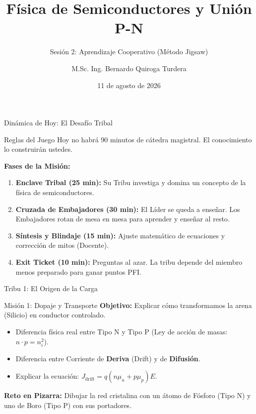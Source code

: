 \documentclass[10pt, aspectratio=169]{beamer}
\title[Circuitos III - Dinámica Tribal]{Física de Semiconductores y Unión P-N}
\subtitle{Sesión 2: Aprendizaje Cooperativo (Método Jigsaw)}
\author{M.Sc. Ing. Bernardo Quiroga Turdera}
\institute[UCB Tarija]{Universidad Católica Boliviana ``San Pablo'' -- Sede Tarija}
\date{11 de agosto de 2026}
\begin{document}
\begin{frame}
  \titlepage
\end{frame}

\begin{frame}{Dinámica de Hoy: El Desafío Tribal}
  \begin{block}{Reglas del Juego}
    Hoy no habrá 90 minutos de cátedra magistral. El conocimiento lo construirán ustedes.
  \end{block}
  
  \vspace{0.3cm}
  \textbf{Fases de la Misión:}
  \begin{enumerate}
      \item \textbf{Enclave Tribal (25 min):} Su Tribu investiga y domina un concepto de la física de semiconductores.
      \item \textbf{Cruzada de Embajadores (30 min):} El Líder se queda a enseñar. Los Embajadores rotan de mesa en mesa para aprender y enseñar al resto.
      \item \textbf{Síntesis y Blindaje (15 min):} Ajuste matemático de ecuaciones y corrección de mitos (Docente).
      \item \textbf{Exit Ticket (10 min):} Preguntas al azar. La tribu depende del miembro menos preparado para ganar puntos PFI.
  \end{enumerate}
\end{frame}

\begin{frame}{Tribu 1: El Origen de la Carga}
  \begin{block}{\faMicrochip \quad Misión 1: Dopaje y Transporte}
    \textbf{Objetivo:} Explicar cómo transformamos la arena (Silicio) en conductor controlado.
    \vspace{0.2cm}
    \begin{itemize}
        \item Diferencia física real entre Tipo N y Tipo P (Ley de acción de masas: $n \cdot p = n_i^2$).
        \item Diferencia entre Corriente de \textbf{Deriva} (Drift) y de \textbf{Difusión}.
        \item Explicar la ecuación: $J_{\text{drift}} = q(n\mu_n + p\mu_p)E$.
    \end{itemize}
  \end{block}
  \vspace{0.3cm}
  \textbf{\faChalkboard \quad Reto en Pizarra:} Dibujar la red cristalina con un átomo de Fósforo (Tipo N) y uno de Boro (Tipo P) con sus portadores.
\end{frame}
\end{document}
